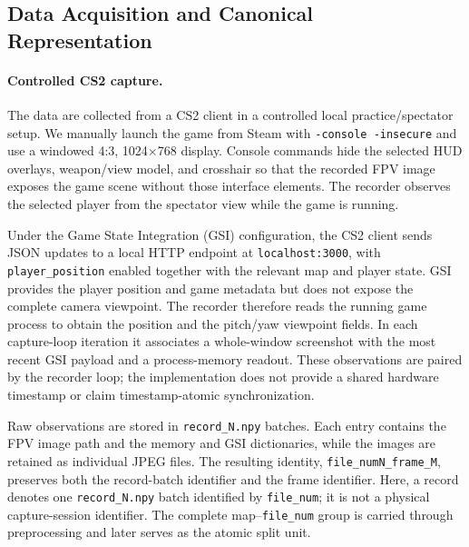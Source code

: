 \subsection{Data Acquisition and Canonical Representation}

\paragraph{Controlled CS2 capture.}
The data are collected from a CS2 client in a controlled local
practice/spectator setup.  We manually launch the game from Steam with
\texttt{-console -insecure} and use a windowed 4:3, 1024$\times$768 display.
Console commands hide the selected HUD overlays,
weapon/view model, and crosshair so that the recorded FPV image exposes the
game scene without those interface elements.  The recorder observes the
selected player from the spectator view while the game is running.

Under the Game State Integration (GSI) configuration, the CS2 client sends
JSON updates to a local HTTP endpoint at \texttt{localhost:3000}, with
\texttt{player\_position} enabled together with the relevant map and player
state.  GSI provides the
player position and game metadata but does not expose the complete camera
viewpoint.  The recorder therefore reads the running game process to obtain
the position and the pitch/yaw viewpoint fields.  In each capture-loop
iteration it associates a whole-window screenshot with the most recent GSI
payload and a process-memory readout.  These observations are paired by the
recorder loop; the implementation does not provide a shared hardware
timestamp or claim timestamp-atomic synchronization.

Raw observations are stored in \texttt{record\_N.npy} batches.  Each entry
contains the FPV image path and the memory and GSI dictionaries, while the
images are retained as individual JPEG files.  The resulting identity,
\texttt{file\_numN\_frame\_M}, preserves both the record-batch identifier and
the frame identifier.  Here, a record denotes one \texttt{record\_N.npy}
batch identified by \texttt{file\_num}; it is not a physical capture-session
identifier.  The complete map--\texttt{file\_num} group is carried through
preprocessing and later serves as the atomic split unit.


